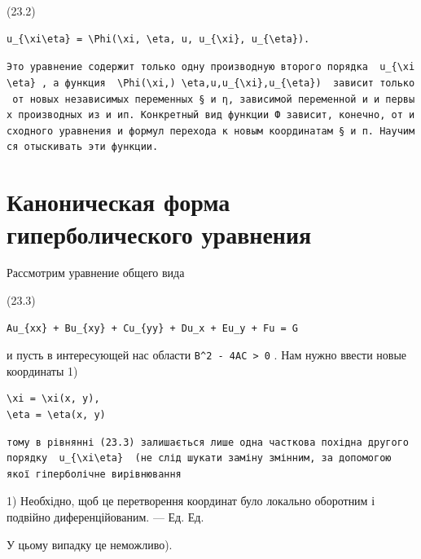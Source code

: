 \documentclass[
  ukrainian,
]{article}
\begin{document}
(23.2)

\begin{verbatim}
u_{\xi\eta} = \Phi(\xi, \eta, u, u_{\xi}, u_{\eta}).
\end{verbatim}

\texttt{Это\ уравнение\ содержит\ только\ одну\ производную\ второго\ порядка\ \ \textquotesingle{}u\_\{\textbackslash{}xi\textbackslash{}eta\}\textquotesingle{}\ ,\ а\ функция\ \ \textquotesingle{}\textbackslash{}Phi(\textbackslash{}xi,)\ \textbackslash{}eta,u,u\_\{\textbackslash{}xi\},u\_\{\textbackslash{}eta\})\textquotesingle{}\ \ зависит\ только\ от\ новых\ независимых\ переменных\ §\ и\ η,\ зависимой\ переменной\ и\ и\ первых\ производных\ из\ и\ ип.\ Конкретный\ вид\ функции\ Ф\ зависит,\ конечно,\ от\ исходного\ уравнения\ и\ формул\ перехода\ к\ новым\ координатам\ §\ и\ п.\ Научимся\ отыскивать\ эти\ функции.}

\section{Каноническая форма гиперболического
уравнения}\label{ux43aux430ux43dux43eux43dux438ux447ux435ux441ux43aux430ux44f-ux444ux43eux440ux43cux430-ux433ux438ux43fux435ux440ux431ux43eux43bux438ux447ux435ux441ux43aux43eux433ux43e-ux443ux440ux430ux432ux43dux435ux43dux438ux44f}

Рассмотрим уравнение общего вида

(23.3)

\begin{verbatim}
Au_{xx} + Bu_{xy} + Cu_{yy} + Du_x + Eu_y + Fu = G
\end{verbatim}

и пусть в интересующей нас области
\texttt{B\^{}2\ -\ 4AC\ \textgreater{}\ 0} . Нам нужно ввести новые
координаты 1)

\begin{verbatim}
\xi = \xi(x, y),
\eta = \eta(x, y)
\end{verbatim}

\begin{verbatim}
тому в рівнянні (23.3) залишається лише одна часткова похідна другого порядку  u_{\xi\eta}  (не слід шукати заміну змінним, за допомогою якої гіперболічне вирівнювання
\end{verbatim}

1) Необхідно, щоб це перетворення координат було локально оборотним і
подвійно диференційованим. --- Ед. Ед.

У цьому випадку це неможливо).
\end{document}
